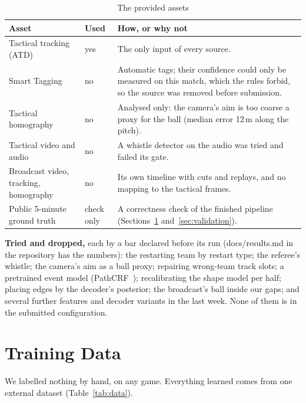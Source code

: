 \documentclass[conference,a4paper]{IEEEtran}
\begin{document}
\begin{table}[t]
\caption{The provided assets}
\label{tab:assets}
\centering
\footnotesize
\begin{tabularx}{\columnwidth}{@{}>{\raggedright\arraybackslash}p{22mm}>{\raggedright\arraybackslash}p{8mm}L@{}}
\toprule
Asset & Used & How, or why not \\
\midrule
Tactical tracking (ATD) & yes & The only input of every source. \\
Smart Tagging & no & Automatic tags; their confidence could only be measured on this match, which the rules
  forbid, so the source was removed before submission. \\
Tactical homography & no & Analysed only: the camera's aim is too coarse a proxy for the ball (median error 12\,m
  along the pitch). \\
Tactical video and audio & no & A whistle detector on the audio was tried and failed its gate. \\
Broadcast video, tracking, homography & no & Its own timeline with cuts and replays, and no mapping to the
  tactical frames. \\
Public 5-minute ground truth & check only & A correctness check of the finished pipeline
  (Sections~\ref{sec:data} and~\ref{sec:validation}). \\
\bottomrule
\end{tabularx}
\end{table}

\textbf{Tried and dropped,} each by a bar declared before its run (docs/results.md in the repository has the
numbers): the restarting team by restart type; the referee's whistle; the camera's aim as a ball proxy; repairing
wrong-team track slots; a pretrained event model (PathCRF~\cite{kim2026}); recalibrating the shape model per half;
placing edges by the decoder's posterior; the broadcast's ball inside our gaps; and several further features and
decoder variants in the last week. None of them is in the submitted configuration.

\section{Training Data}
\label{sec:data}

We labelled nothing by hand, on any game. Everything learned comes from one external dataset
(Table~\ref{tab:data}).
\end{document}
